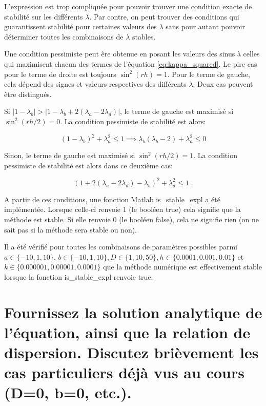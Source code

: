 \documentclass[a4paper, 12pt]{report}
\newcommand{\code}[1]{\textsf{#1}}
\begin{document}
L'expression est trop compliquée pour pouvoir trouver une condition exacte
de stabilité sur les différents $\lambda$. Par contre, on peut trouver
des conditions qui guarantissent stabilité pour certaines valeurs des $\lambda$
sans pour autant pouvoir déterminer toutes les combinaisons de $\lambda$ stables.

Une condition pessimiste peut êre obtenue en posant les valeurs des sinus à celles
qui maximisent chacun des termes de l'équation \eqref{eq:kappa_squared}.
Le pire cas pour le terme de droite est toujours $\sin^2(rh)=1$. Pour le terme
de gauche, cela dépend des signes et valeurs respectives des différents
$\lambda$. Deux cas peuvent être distingués.

Si $|1-\lambda_b| > |1-\lambda_b + 2 (\lambda_a-2\lambda_d)|$, le terme de gauche
est maximisé si $\sin^2(rh/2)=0$. La condition pessimiste de stabilité
est alors:

\begin{equation}
  \left (1-\lambda_b \right )^2 + \lambda_a^2 \le 1 \implies \lambda_b (\lambda_b-2) + \lambda_a^2 \le 0
\end{equation}

Sinon, le terme de gauche est maximisé si $\sin^2(rh/2)=1$. La condition
pessimiste de stabilité est alors dans ce deuxième cas:

\begin{equation}
    \left ( 1+2(\lambda_a-2\lambda_d) - \lambda_b \right )^2 + \lambda_a^2 \le 1 \;.
    \label{eq:expl_stabilite_cond_2}
\end{equation}

A partir de ces conditions, une fonction Matlab \code{is\_stable\_expl} a été
implémentée. Lorsque celle-ci renvoie $1$ (le booléen \code{true}) cela signifie
que la méthode est stable. Si elle renvoie $0$ (le booléen \code{false}), cela
ne signifie rien (on ne sait pas si la méthode sera stable ou non).

Il a été vérifié pour toutes les combinaisons de paramètres possibles parmi $a \in \{-10, 1, 10\}$,
$b \in \{-10, 1, 10\}, D \in \{1, 10, 50\}, h \in \{0.0001, 0.001, 0.01\}$
et $k \in \{0.000001, 0.00001, 0.0001\}$ que la méthode numérique est
effectivement stable lorsque la fonction \code{is\_stable\_expl} renvoie \code{true}.


\section{Fournissez la solution analytique de l'équation, ainsi que la relation
de dispersion. Discutez brièvement les cas particuliers déjà vus au cours (D=0, b=0, etc.).}
\end{document}
